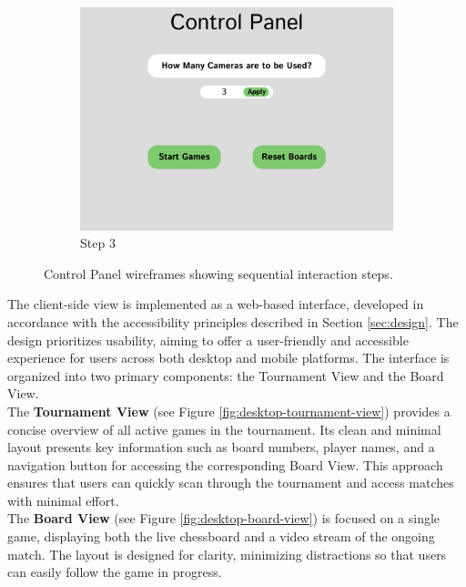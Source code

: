 \begin{figure}[h!]
    \begin{subfigure}[h!]{0.40\linewidth}
        \centering
        \includegraphics[width=\linewidth]{figures/methods/wireframes/control-panel-3.png}
        \caption{Step 3}
        \label{fig:control-panel-3}
    \end{subfigure}
    
    \caption[Control panel wireframes]{Control Panel wireframes showing sequential interaction steps.}
    \label{fig:control-panel-group}
\end{figure}


The client-side view is implemented as a web-based interface, developed in accordance with the accessibility principles described in Section \ref{sec:design}. The design prioritizes usability, aiming to offer a user-friendly and accessible experience for users across both desktop and mobile platforms. The interface is organized into two primary components: the Tournament View and the Board View. \\

The \textbf{Tournament View} (see Figure \ref{fig:desktop-tournament-view}) provides a concise overview of all active games in the tournament. Its clean and minimal layout presents key information such as board numbers, player names, and a navigation button for accessing the corresponding Board View. This approach ensures that users can quickly scan through the tournament and access matches with minimal effort. \\

The \textbf{Board View} (see Figure \ref{fig:desktop-board-view}) is focused on a single game, displaying both the live chessboard and a video stream of the ongoing match. The layout is designed for clarity, minimizing distractions so that users can easily follow the game in progress. \\

